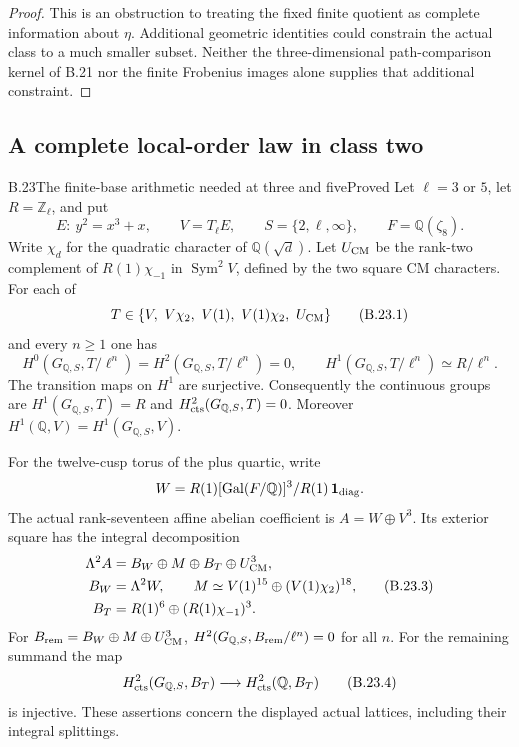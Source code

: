 \begin{proof}
This is an obstruction to treating the fixed finite
quotient as complete information about $\eta$.
Additional geometric identities could constrain the
actual class to a much smaller subset. Neither the
three-dimensional path-comparison kernel of B.21
nor the finite Frobenius images alone supplies that
additional constraint.
\end{proof}

\subsection{A complete local-order law in class two}

\begin{statement}{B.23}{The finite-base arithmetic needed at three and five}{Proved}
Let $\ell=3$ or $5$, let $R=\mathbb Z_\ell$, and put
\[
 E:\ y^2=x^3+x,\qquad V=T_\ell E,\qquad
 S=\{2,\ell,\infty\},\qquad F=\mathbb Q(\zeta_8).
\]
Write $\chi_d$ for the quadratic character of $\mathbb Q(\sqrt d)$.
Let $U_{\rm CM}$ be the rank-two complement of
$R(1)\chi_{-1}$ in $\operatorname{Sym}^2V$, defined by the
two square CM characters. For each of
\[
 T\in\{V,\ V\chi_2,\ V(1),\ V(1)\chi_2,\ U_{\rm CM}\}
                                                               \tag{B.23.1}
\]
and every $n\geq1$ one has
\[
 H^0(G_{\mathbb Q,S},T/\ell^n)=
 H^2(G_{\mathbb Q,S},T/\ell^n)=0,\qquad
 H^1(G_{\mathbb Q,S},T/\ell^n)\simeq R/\ell^n.
                                                               \tag{B.23.2}
\]
The transition maps on $H^1$ are surjective. Consequently the
continuous groups are $H^1(G_{\mathbb Q,S},T)=R$ and
$H^2_{\rm cts}(G_{\mathbb Q,S},T)=0$.
Moreover $H^1(\mathbb Q,V)=H^1(G_{\mathbb Q,S},V)$.

For the twelve-cusp torus of the plus quartic, write
\[
 W=R(1)[\operatorname{Gal}(F/\mathbb Q)]^3/
             R(1)\,\mathbf 1_{\rm diag}.
\]
The actual rank-seventeen affine abelian coefficient is
$A=W\oplus V^3$. Its exterior square has the integral
decomposition
\[
 \begin{split}
 \Lambda^2A={}&B_W\oplus M\oplus B_T\oplus U_{\rm CM}^3,\\
 B_W={}&\Lambda^2W,\qquad
 M\simeq V(1)^{15}\oplus(V(1)\chi_2)^{18},\\
 B_T={}&R(1)^6\oplus(R(1)\chi_{-1})^3 .
 \end{split}                                                    \tag{B.23.3}
\]
For $B_{\rm rem}=B_W\oplus M\oplus U_{\rm CM}^3$,
$H^2(G_{\mathbb Q,S},B_{\rm rem}/\ell^n)=0$ for all $n$.
For the remaining summand the map
\[
 H^2_{\rm cts}(G_{\mathbb Q,S},B_T)
       \longrightarrow H^2_{\rm cts}(\mathbb Q,B_T)
                                                               \tag{B.23.4}
\]
is injective. These assertions concern the displayed actual
lattices, including their integral splittings.
\end{statement}
